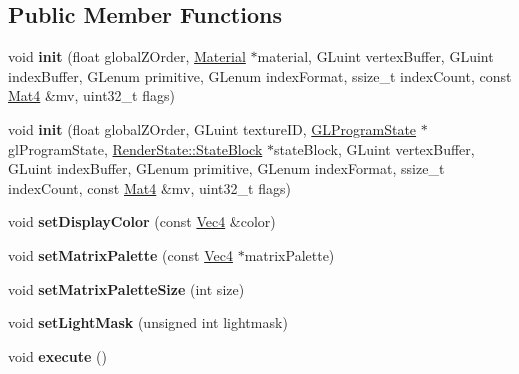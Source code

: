 \subsection*{Public Member Functions}
\begin{DoxyCompactItemize}
\item 
\mbox{\label{classMeshCommand_a3a2f0f5afc750aa041f8834a936b271b}} 
void {\bfseries init} (float global\+Z\+Order, \hyperlink{classMaterial}{Material} $\ast$material, G\+Luint vertex\+Buffer, G\+Luint index\+Buffer, G\+Lenum primitive, G\+Lenum index\+Format, ssize\+\_\+t index\+Count, const \hyperlink{classMat4}{Mat4} \&mv, uint32\+\_\+t flags)
\item 
\mbox{\label{classMeshCommand_a96b4febd65cab75d3f8fd2f4060a7add}} 
void {\bfseries init} (float global\+Z\+Order, G\+Luint texture\+ID, \hyperlink{classGLProgramState}{G\+L\+Program\+State} $\ast$gl\+Program\+State, \hyperlink{classRenderState_1_1StateBlock}{Render\+State\+::\+State\+Block} $\ast$state\+Block, G\+Luint vertex\+Buffer, G\+Luint index\+Buffer, G\+Lenum primitive, G\+Lenum index\+Format, ssize\+\_\+t index\+Count, const \hyperlink{classMat4}{Mat4} \&mv, uint32\+\_\+t flags)
\item 
\mbox{\label{classMeshCommand_a39b7aab96030ae6bab92400de2ed8022}} 
void {\bfseries set\+Display\+Color} (const \hyperlink{classVec4}{Vec4} \&color)
\item 
\mbox{\label{classMeshCommand_ac14323dc333b9f0ffb4905dfcd4f72c8}} 
void {\bfseries set\+Matrix\+Palette} (const \hyperlink{classVec4}{Vec4} $\ast$matrix\+Palette)
\item 
\mbox{\label{classMeshCommand_a63f2a151e3f5729875b2b81db60f0de9}} 
void {\bfseries set\+Matrix\+Palette\+Size} (int size)
\item 
\mbox{\label{classMeshCommand_a1e220119395615b722417accd54f930d}} 
void {\bfseries set\+Light\+Mask} (unsigned int lightmask)
\item 
\mbox{\label{classMeshCommand_a150b126cc1cc72af1b77fa776eab0535}} 
void {\bfseries execute} ()
\item 
\mbox{\label{classMeshCommand_a3a188b7afec903df212669edfcede1e6}} 

\end{DoxyCompactItemize}
